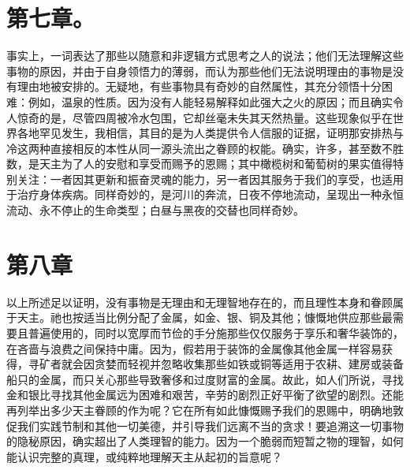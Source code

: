 
\section{第七章。}

事实上，一词表达了那些以随意和非逻辑方式思考之人的说法；他们无法理解这些事物的原因，并由于自身领悟力的薄弱，而认为那些他们无法说明理由的事物是没有理由地被安排的。无疑地，有些事物具有奇妙的自然属性，其充分领悟十分困难：例如，温泉的性质。因为没有人能轻易解释如此强大之火的原因；而且确实令人惊奇的是，尽管四周被冷水包围，它却丝毫未失其天然热量。这些现象似乎在世界各地罕见发生，我相信，其目的是为人类提供令人信服的证据，证明那安排热与冷这两种直接相反的本性从同一源头流出之眷顾的权能。确实，许多，甚至数不胜数，是天主为了人的安慰和享受而赐予的恩赐；其中橄榄树和葡萄树的果实值得特别关注：一者因其更新和振奋灵魂的能力，另一者因其服务于我们的享受，也适用于治疗身体疾病。同样奇妙的，是河川的奔流，日夜不停地流动，呈现出一种永恒流动、永不停止的生命类型；白昼与黑夜的交替也同样奇妙。\par


\section{第八章 }

以上所述足以证明，没有事物是无理由和无理智地存在的，而且理性本身和眷顾属于天主。祂也按适当比例分配了金属，如金、银、铜及其他；慷慨地供应那些最需要且普遍使用的，同时以宽厚而节俭的手分施那些仅仅服务于享乐和奢华装饰的，在吝啬与浪费之间保持中庸。因为，假若用于装饰的金属像其他金属一样容易获得，寻矿者就会因贪婪而轻视并忽略收集那些如铁或铜等适用于农耕、建房或装备船只的金属，而只关心那些导致奢侈和过度财富的金属。故此，如人们所说，寻找金和银比寻找其他金属远为困难和艰苦，辛劳的剧烈正好平衡了欲望的剧烈。还能再列举出多少天主眷顾的作为呢？它在所有如此慷慨赐予我们的恩赐中，明确地敦促我们实践节制和其他一切美德，并引导我们远离不当的贪求！要追溯这一切事物的隐秘原因，确实超出了人类理智的能力。因为一个脆弱而短暂之物的理智，如何能认识完整的真理，或纯粹地理解天主从起初的旨意呢？\par

